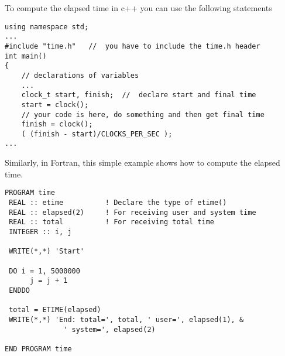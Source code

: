 \documentclass[11pt,a4wide]{article}
\begin{document}
\begin{enumerate}
To compute the elapsed time in c++ you can use the following statements
\begin{lstlisting}[title={Time in C++}]
using namespace std;
...
#include "time.h"   //  you have to include the time.h header
int main()
{
    // declarations of variables 
    ...
    clock_t start, finish;  //  declare start and final time
    start = clock();
    // your code is here, do something and then get final time
    finish = clock();
    ( (finish - start)/CLOCKS_PER_SEC );
...
\end{lstlisting}
Similarly, in Fortran, this simple example shows how to compute the elapsed time.
\lstset{language=[90]Fortran}
\begin{lstlisting}[title={Time in Fortran}]
PROGRAM time
 REAL :: etime          ! Declare the type of etime()
 REAL :: elapsed(2)     ! For receiving user and system time
 REAL :: total          ! For receiving total time
 INTEGER :: i, j

 WRITE(*,*) 'Start'

 DO i = 1, 5000000  
      j = j + 1
 ENDDO

 total = ETIME(elapsed)
 WRITE(*,*) 'End: total=', total, ' user=', elapsed(1), &
              ' system=', elapsed(2)

END PROGRAM time
\end{lstlisting}

\end{enumerate}
\end{document}

